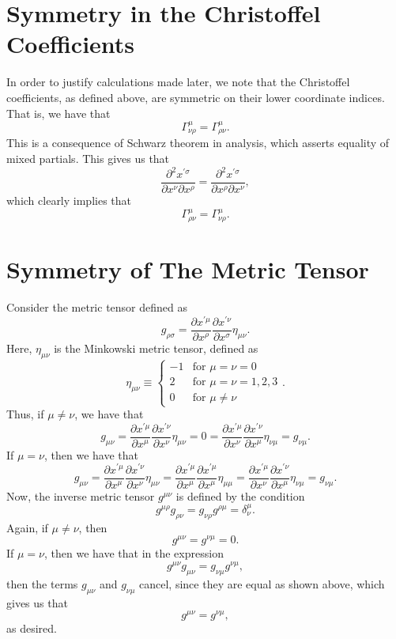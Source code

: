 \documentclass[12pt]{article}
\theoremstyle{definition}
\theoremstyle{remark}
\begin{document}
\section{Symmetry in the Christoffel Coefficients}

In order to justify calculations made later, we note that the Christoffel coefficients, as defined above, are symmetric on their lower coordinate indices.  That is, we have that 
\[
\Gamma^{ \mu }_{ \nu \rho } 
= 
\Gamma^{ \mu }_{ \rho \nu }.
\]
This is a consequence of Schwarz theorem in analysis, which asserts equality of mixed partials.  This gives us that 
\[
\frac{ \partial^2 x^{ \prime \sigma } }{ \partial x^{ \nu }  \partial x^{ \rho } } 
=
\frac{ \partial^2 x^{ \prime \sigma } }{ \partial x^{ \rho }  \partial x^{ \nu } },
\]
which clearly implies that 
\[
\Gamma_{ \rho \nu }^{ \mu } = \Gamma_{ \nu \rho }^{ \mu } .
\]




\section{Symmetry of The Metric Tensor}

Consider the metric tensor defined as 
\[
g_{ \rho \sigma } =
\frac{ \partial x^{ \prime \mu } }{ \partial x^{ \rho } } 
\frac{ \partial x^{ \prime \nu } }{ \partial x^{ \sigma } } 
\eta_{ \mu \nu } .
\]
Here, $\eta_{\mu \nu}$ is the Minkowski metric tensor, defined as
\[
\eta_{\mu \nu} 
\equiv
\begin{cases}
-1 & \text{for} \,\, \mu = \nu = 0 \\
2 & \text{for} \,\, \mu = \nu = 1,2,3 \\
0 & \text{for} \,\, \mu \neq \nu
\end{cases}.
\]
Thus, if $\mu \neq \nu$, we have that
\[
g_{ \mu \nu}
 =  
\frac{ \partial x^{ \prime \mu } }{ \partial x^{ \mu } } 
\frac{ \partial x^{ \prime \nu } }{ \partial x^{ \nu } } 
\eta_{ \mu \nu } 
=
0
=
\frac{ \partial x^{ \prime \mu } }{ \partial x^{ \nu } } 
\frac{ \partial x^{ \prime \nu } }{ \partial x^{ \mu } } 
\eta_{ \nu \mu } 
=
g_{\nu \mu}.
\]
If $\mu = \nu$, then we have that 
\[
g_{\mu \nu} 
=
\frac{ \partial x^{ \prime \mu } }{ \partial x^{ \mu } } 
\frac{ \partial x^{ \prime \nu } }{ \partial x^{ \nu } } 
\eta_{ \mu \nu } 
=
\frac{ \partial x^{ \prime \mu } }{ \partial x^{ \mu } } 
\frac{ \partial x^{ \prime \mu } }{ \partial x^{ \mu } } 
\eta_{ \mu \mu }
=
\frac{ \partial x^{ \prime \mu } }{ \partial x^{ \nu } } 
\frac{ \partial x^{ \prime \nu } }{ \partial x^{ \mu } } 
\eta_{ \nu \mu } 
=
g_{ \nu \mu} .
\]
Now, the inverse metric tensor $g^{\mu \nu}$ is defined by the condition 
\[
g^{ \mu \rho } g_{ \rho \nu } 
= 
g_{ \nu \rho } g^{ \rho \mu } 
= 
\delta_{ \nu }^{ \mu } .
\]
Again, if $\mu \neq \nu$, then 
\[
g^{ \mu \nu } = g^{ \nu \mu } = 0.
\]
If $\mu = \nu$, then we have that in the expression 
\[
g^{ \mu \nu} g_{ \mu \nu } 
=
g_{\nu \mu } g^{ \nu \mu },
\]
then the terms $g_{\mu \nu}$ and $g_{\nu \mu}$ cancel, since they are equal as shown above, which gives us that 
\[
g^{ \mu \nu } = g^{ \nu \mu },
\]
as desired.  
\end{document}
